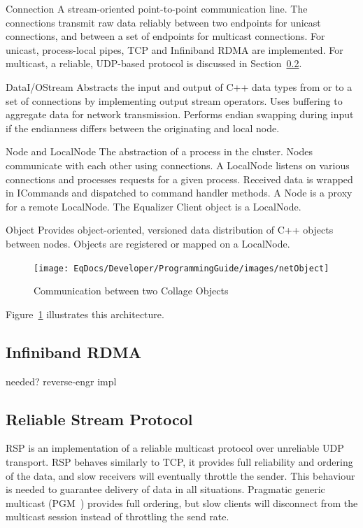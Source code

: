 \documentclass[10pt,journal,compsoc]{IEEEtran}
\newcommand{\sref}[1]{Section~\ref{#1}}
\newcommand{\fig}[1]{Figure~\ref{#1}}
\begin{document}
\begin{compactdesc}
\item[Connection] A stream-oriented point-to-point communication
  line. The connections
  transmit raw data reliably between two endpoints for unicast connections, and
  between a set of endpoints for multicast connections. For unicast,
  process-local pipes, TCP and Infiniband RDMA are implemented. For multicast,
  a reliable, UDP-based protocol is discussed in \sref{sec:RSP}.
\item[DataI/OStream] Abstracts the input and output of C++ data types from or to
  a set of connections by implementing output stream operators. Uses buffering
  to aggregate data for network transmission. Performs endian swapping during
  input if the endianness differs between the originating and local node.
\item[Node and LocalNode] The abstraction of a process in the cluster. Nodes
  communicate with each other using connections. A LocalNode listens on various
  connections and processes requests for a given process. Received data is
  wrapped in ICommands and dispatched to command handler methods. A Node is a
  proxy for a remote LocalNode. The Equalizer Client object is a LocalNode.
\item[Object] Provides object-oriented, versioned data distribution of C++
  objects between nodes. Objects are registered or mapped on a Local\-Node.
\end{compactdesc}

\begin{figure}[ht]\center
  \texttt{[image: EqDocs/Developer/ProgrammingGuide/images/netObject]}
  \caption{\label{fNetObject}Communication between two Collage Objects}
\end{figure}
\fig{fNetObject} illustrates this architecture.

\subsection{Infiniband RDMA}

needed? reverse-engr impl

\subsection{Reliable Stream Protocol}\label{sec:RSP}

RSP is an implementation of a reliable multicast protocol over unreliable UDP
transport. RSP behaves similarly to TCP, it provides full reliability and
ordering of the data, and slow receivers will eventually throttle the
sender. This behaviour is needed to guarantee delivery of data in all
situations. Pragmatic generic multicast (PGM~\cite{pgm}) provides full ordering,
but slow clients will disconnect from the multicast session instead of
throttling the send rate.
\end{document}
